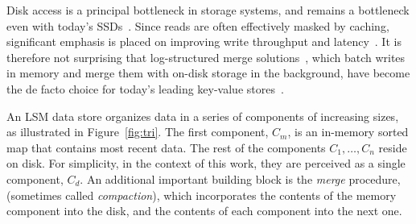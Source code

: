 Disk access is a principal bottleneck in storage systems,
and remains a bottleneck even with today's
SSDs~\cite{Tanenbaum:2014:MOS,RocksDBBenchmarks,Wu:2012:AWB}. Since reads are often effectively masked by
caching, significant emphasis is placed on improving write throughput and latency~\cite{Tanenbaum:2014:MOS}.
It is therefore not surprising that log-structured merge solutions~\cite{O'Neil1996}, which batch writes  in memory
and merge them with on-disk storage in the background, have become the de facto
choice for today's leading key-value stores~\cite{Bigtable2006, FBMessaging2012, leveldb, RocksDB, Hyperdex2012, BLSM2012}.

An LSM data store organizes data in a series of components of increasing sizes, as illustrated in Figure~\ref{fig:tri}.
The first component, $C_m$, is an in-memory sorted
map that contains most recent data. The rest of the
components $C_1, \ldots, C_n$ reside on disk. For simplicity, in the context of
this work, they are perceived as a single
component, $C_d$.
An additional  important building block is the
\emph{merge} procedure, (sometimes called \emph{compaction}), which incorporates the contents of the memory component
into the disk, and the contents of each component into the next one.






